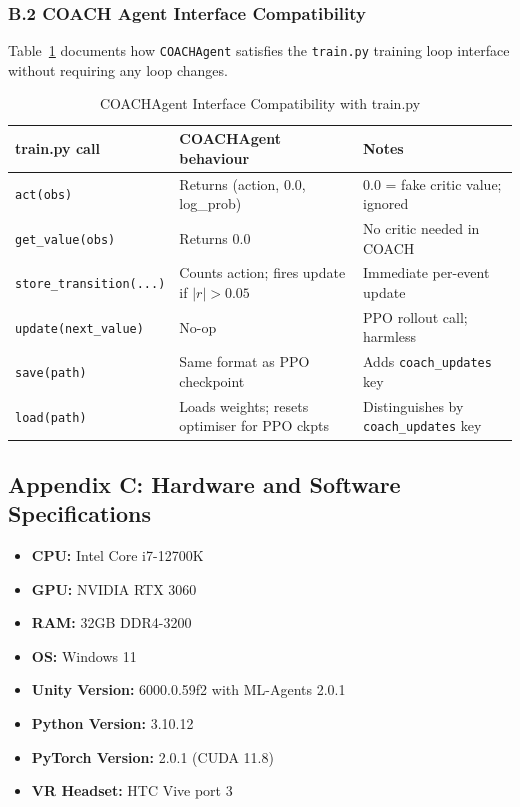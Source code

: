 \documentclass[../report.tex]{subfiles}
\begin{document}
    \subsubsection*{B.2 COACH Agent Interface Compatibility}

    Table~\ref{tab:coach-interface} documents how \texttt{COACHAgent} satisfies the \texttt{train.py} training loop interface without requiring any loop changes.

    \begin{table}[t]
        \centering
        \caption{COACHAgent Interface Compatibility with train.py}
        \label{tab:coach-interface}
        \begin{tabular}{lll}
            \toprule
            \textbf{train.py call} & \textbf{COACHAgent behaviour} & \textbf{Notes} \\
            \midrule
            \texttt{act(obs)} & Returns (action, 0.0, log\_prob) & 0.0 = fake critic value; ignored \\
            \texttt{get\_value(obs)} & Returns 0.0 & No critic needed in COACH \\
            \texttt{store\_transition(...)} & Counts action; fires update if $|r|>0.05$ & Immediate per-event update \\
            \texttt{update(next\_value)} & No-op & PPO rollout call; harmless \\
            \texttt{save(path)} & Same format as PPO checkpoint & Adds \texttt{coach\_updates} key \\
            \texttt{load(path)} & Loads weights; resets optimiser for PPO ckpts & Distinguishes by \texttt{coach\_updates} key \\
            \bottomrule
        \end{tabular}
    \end{table}

    \subsection*{Appendix C: Hardware and Software Specifications}

    \begin{itemize}
        \item \textbf{CPU:} Intel Core i7-12700K
        \item \textbf{GPU:} NVIDIA RTX 3060
        \item \textbf{RAM:} 32GB DDR4-3200
        \item \textbf{OS:} Windows 11 
        \item \textbf{Unity Version:} 6000.0.59f2 with ML-Agents 2.0.1
        \item \textbf{Python Version:} 3.10.12
        \item \textbf{PyTorch Version:} 2.0.1 (CUDA 11.8)
        \item \textbf{VR Headset:} HTC Vive port 3
    \end{itemize}
\end{document}
